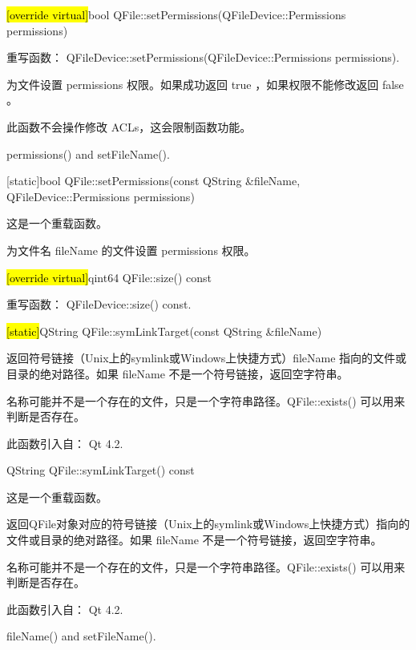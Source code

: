 \splitLine

\hl{[override virtual]}bool QFile::setPermissions(QFileDevice::Permissions permissions)

重写函数： QFileDevice::setPermissions(QFileDevice::Permissions permissions).

为文件设置 permissions 权限。如果成功返回 true ，如果权限不能修改返回 false 。



\begin{notice}[警告]
此函数不会操作修改 ACLs，这会限制函数功能。
\end{notice}

\begin{notice}[另请参阅]
permissions() and setFileName().
\end{notice}

\splitLine

[static]bool QFile::setPermissions(const QString \&fileName, QFileDevice::Permissions permissions)

这是一个重载函数。

为文件名 fileName 的文件设置 permissions 权限。

\hl{[override virtual]}qint64 QFile::size() const

重写函数： QFileDevice::size() const.

\splitLine

\hl{[static]}QString QFile::symLinkTarget(const QString \&fileName)

返回符号链接（Unix上的symlink或Windows上快捷方式）fileName 指向的文件或目录的绝对路径。如果 fileName 不是一个符号链接，返回空字符串。

名称可能并不是一个存在的文件，只是一个字符串路径。QFile::exists() 可以用来判断是否存在。

此函数引入自： Qt 4.2.

\splitLine

QString QFile::symLinkTarget() const

这是一个重载函数。

返回QFile对象对应的符号链接（Unix上的symlink或Windows上快捷方式）指向的文件或目录的绝对路径。如果 fileName 不是一个符号链接，返回空字符串。

名称可能并不是一个存在的文件，只是一个字符串路径。QFile::exists() 可以用来判断是否存在。

此函数引入自： Qt 4.2.

\begin{notice}[另请参阅]
fileName() and setFileName().
\end{notice}
